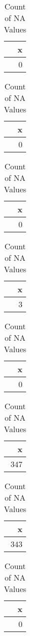 \documentclass[]{article}
\begin{document}
\begin{table}
\caption{Count of NA Values}

\centering
\begin{tabular}[t]{r}
\hline
x\\
\hline
0\\
\hline
\end{tabular}
\centering
\begin{tabular}[t]{r}
\hline
x\\
\hline
0\\
\hline
\end{tabular}
\centering
\begin{tabular}[t]{r}
\hline
x\\
\hline
0\\
\hline
\end{tabular}
\centering
\begin{tabular}[t]{r}
\hline
x\\
\hline
3\\
\hline
\end{tabular}
\centering
\begin{tabular}[t]{r}
\hline
x\\
\hline
0\\
\hline
\end{tabular}
\centering
\begin{tabular}[t]{r}
\hline
x\\
\hline
347\\
\hline
\end{tabular}
\centering
\begin{tabular}[t]{r}
\hline
x\\
\hline
343\\
\hline
\end{tabular}
\centering
\begin{tabular}[t]{r}
\hline
x\\
\hline
0\\
\hline
\end{tabular}
\end{table}
\end{document}
